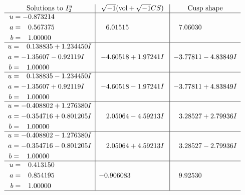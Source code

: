 \documentclass[1p]{elsarticle_modified}
\theoremstyle{definition}
\newcommand{\I}{\sqrt{-1}}
\begin{document}
$$\begin{array}{c|c|c}  
\text{Solutions to }I^u_{2}& \I (\text{vol} + \sqrt{-1}CS) & \text{Cusp shape}\\
 \hline 
\begin{aligned}
u &= -0.873214\phantom{ +0.000000I} \\
a &= \phantom{-}0.567375\phantom{ +0.000000I} \\
b &= \phantom{-}1.00000\phantom{ +0.000000I}\end{aligned}
 & \phantom{-}6.01515\phantom{ +0.000000I} & \phantom{-}7.06030\phantom{ +0.000000I} \\ \hline\begin{aligned}
u &= \phantom{-}0.138835 + 1.234450 I \\
a &= -1.35607 - 0.92119 I \\
b &= \phantom{-}1.00000\phantom{ +0.000000I}\end{aligned}
 & -4.60518 + 1.97241 I & -3.77811 - 4.83849 I \\ \hline\begin{aligned}
u &= \phantom{-}0.138835 - 1.234450 I \\
a &= -1.35607 + 0.92119 I \\
b &= \phantom{-}1.00000\phantom{ +0.000000I}\end{aligned}
 & -4.60518 - 1.97241 I & -3.77811 + 4.83849 I \\ \hline\begin{aligned}
u &= -0.408802 + 1.276380 I \\
a &= -0.354716 + 0.801205 I \\
b &= \phantom{-}1.00000\phantom{ +0.000000I}\end{aligned}
 & \phantom{-}2.05064 - 4.59213 I & \phantom{-}3.28527 + 2.79936 I \\ \hline\begin{aligned}
u &= -0.408802 - 1.276380 I \\
a &= -0.354716 - 0.801205 I \\
b &= \phantom{-}1.00000\phantom{ +0.000000I}\end{aligned}
 & \phantom{-}2.05064 + 4.59213 I & \phantom{-}3.28527 - 2.79936 I \\ \hline\begin{aligned}
u &= \phantom{-}0.413150\phantom{ +0.000000I} \\
a &= \phantom{-}0.854195\phantom{ +0.000000I} \\
b &= \phantom{-}1.00000\phantom{ +0.000000I}\end{aligned}
 & -0.906083\phantom{ +0.000000I} & \phantom{-}9.92530\phantom{ +0.000000I}\\
 \hline 
 \end{array}$$\newpage
\end{document}
